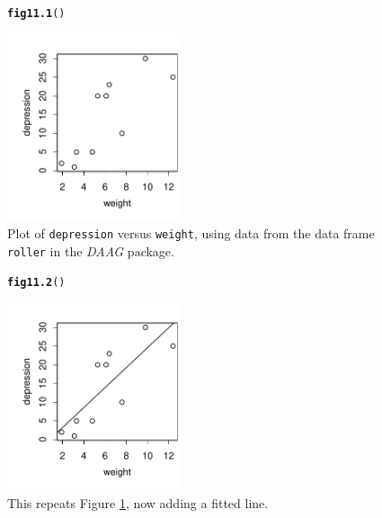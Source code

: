 \documentclass[12pt, a4paper,  BCOR=8.25mm, DIV=15]{scrartcl}\usepackage[]{graphicx}\usepackage[]{color}
\makeatletter
\newcommand{\hlstd}[1]{\textcolor[rgb]{0.345,0.345,0.345}{#1}}%
\newcommand{\hlkwd}[1]{\textcolor[rgb]{0.737,0.353,0.396}{\textbf{#1}}}%
\newenvironment{kframe}{%
 \def\at@end@of@kframe{}%
 \ifinner\ifhmode%
  \def\at@end@of@kframe{\end{minipage}}%
  \begin{minipage}{\columnwidth}%
 \fi\fi%
 \def\FrameCommand##1{\hskip\@totalleftmargin \hskip-\fboxsep
 \colorbox{shadecolor}{##1}\hskip-\fboxsep
     \hskip-\linewidth \hskip-\@totalleftmargin \hskip\columnwidth}%
 \MakeFramed {\advance\hsize-\width
   \@totalleftmargin\z@ \linewidth\hsize
   \@setminipage}}%
 {\par\unskip\endMakeFramed%
 \at@end@of@kframe}
\newenvironment{knitrout}{}{} %
\newcommand{\txtt}[1]{{\texttt{#1}}}
\makeatother
\begin{document}
\begin{figure}[H]
\begin{knitrout}
\color{fgcolor}\begin{kframe}
\begin{alltt}
\hlkwd{fig11.1}\hlstd{()}
\end{alltt}
\end{kframe}

{\centering \includegraphics[width=0.45\textwidth]{figs/reg-plt-roller-11_1-1} 

}



\end{knitrout}
  \caption{Plot of \txtt{depression} versus \txtt{weight}, using data
from the data frame \txtt{roller} in the {\em DAAG}
package.}\label{fig:rollerPlot}
\end{figure}

\begin{figure}[H]
\begin{knitrout}
\color{fgcolor}\begin{kframe}
\begin{alltt}
\hlkwd{fig11.2}\hlstd{()}
\end{alltt}
\end{kframe}

{\centering \includegraphics[width=0.45\textwidth]{figs/reg-pltWline-11_2-1} 

}



\end{knitrout}
\caption{This repeats Figure \ref{fig:rollerPlot}, now adding a fitted
  line.}\label{fig:rollerPlot-withline}
\end{figure}
\end{document}
